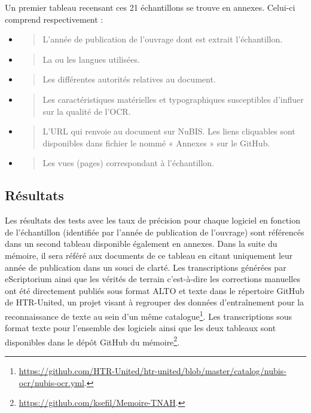 \documentclass[a4paper,12pt,twoside]{book}
\begin{document}
	Un premier tableau recensant  ces 21 échantillons se trouve en
	annexes. Celui-ci comprend respectivement : \\
	
	\begin{itemize}
		\item
		\begin{quote}
			L'année de publication de l'ouvrage dont est extrait l'échantillon.
		\end{quote}
		\item
		\begin{quote}
			La ou les langues utilisées.
		\end{quote}
		\item
		\begin{quote}
			Les différentes autorités relatives au document.
		\end{quote}
		\item
		\begin{quote}
			Les caractéristiques matérielles et typographiques susceptibles
			d'influer sur la qualité de l'OCR.
		\end{quote}
		\item
		\begin{quote}
			L'URL qui renvoie au document sur NuBIS. Les liens cliquables sont disponibles dans fichier le nommé « Annexes » sur le GitHub.
		\end{quote}
		\item
		\begin{quote}
			Les vues (pages) correspondant à l'échantillon. \\
		\end{quote}
	\end{itemize}
	
	
	\subsection{Résultats}
	
	Les résultats des tests avec les taux de précision pour chaque logiciel
	en fonction de l'échantillon (identifiée par l'année de publication de
	l'ouvrage) sont référencés dans un second tableau disponible également
	en annexes. Dans la suite du mémoire, il sera référé aux documents de ce
	tableau en citant uniquement leur année de publication dans un souci de
	clarté. Les transcriptions générées par eScriptorium ainsi que les
	vérités de terrain c'est-à-dire les corrections manuelles ont été directement publiés sous format ALTO et texte
	dans le répertoire GitHub de HTR-United, un projet visant à regrouper
	des données d'entraînement pour la reconnaissance de
	texte au sein d'un même catalogue\footnote{\url{https://github.com/HTR-United/htr-united/blob/master/catalog/nubis-ocr/nubis-ocr.yml}.}.
	Les transcriptions sous format texte pour l'ensemble des logiciels ainsi
	que les deux tableaux sont disponibles dans le dépôt GitHub du
	mémoire\footnote{\url{https://github.com/ksefil/Memoire-TNAH}.}. \\
	
\end{document}
